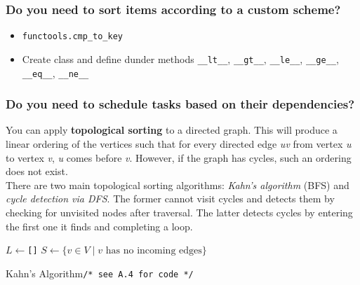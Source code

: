 \documentclass[12pt, titlepage]{article}
\begin{document}
\subsubsection{Do you need to sort items according to a custom scheme?}
\begin{itemize}
  \item \texttt{functools.cmp\_to\_key} 
  \item Create class and define dunder methods \texttt{\_\_lt\_\_}, \texttt{\_\_gt\_\_}, \texttt{\_\_le\_\_}, \texttt{\_\_ge\_\_}, \texttt{\_\_eq\_\_}, \texttt{\_\_ne\_\_}
\end{itemize}
\bigskip

\subsubsection{Do you need to schedule tasks based on their dependencies?}

You can apply \textbf{topological sorting} to a directed graph. This will produce a linear ordering of the vertices such that for every directed edge \textit{uv} from vertex \textit{u} to vertex \textit{v}, \textit{u} comes before \textit{v}. However, if the graph has cycles, such an ordering does not exist.\medskip\\

There are two main topological sorting algorithms: \textit{Kahn's algorithm} (BFS) and \textit{cycle detection via DFS}. The former cannot visit cycles and detects them by checking for unvisited nodes after traversal. The latter detects cycles by entering the first one it finds and completing a loop.\\

\begin{algorithm}[H]
  \SetAlgoLined
  \DontPrintSemicolon
  $L \longleftarrow$\hspace{0.5mm}\texttt{[]}\;
  $S \longleftarrow \{v \in V \mid v \text{ has no incoming edges}\}$\;
  \caption{Kahn's Algorithm\hspace{13mm}\texttt{/* see A.4 for code */}}
\end{algorithm}
\bigskip
\end{document}
